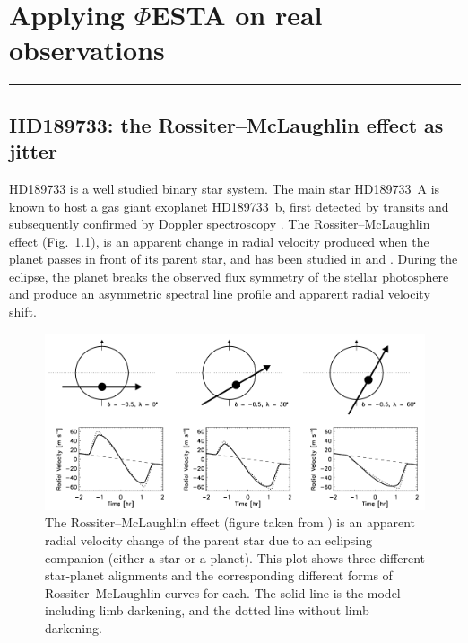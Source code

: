 \chapter{Applying $\mathit{\Phi}$ESTA on real observations}
\label{\thechapter}
\label{ch:Methods}


\rule{\textwidth}{1.6pt}
\minitoc
\clearpage



\section{HD189733: the Rossiter–McLaughlin effect as jitter}
\label{\thesection}
\label{sec:HD189733}

HD189733 is a well studied binary star system. The main star HD189733~A is known to host a gas giant exoplanet HD189733~b, first detected by transits and subsequently confirmed by Doppler spectroscopy \cite{Bouchy2005ELODIE}. The Rossiter–McLaughlin effect (Fig.~\ref{fig:rm-effect}), is an apparent change in radial velocity produced when the planet passes in front of its parent star, and has been studied in \cite{Cochran2006} and \cite{Triaud2009}. During the eclipse, the planet breaks the observed flux symmetry of the stellar photosphere and produce an asymmetric spectral line profile and apparent radial velocity shift.

\begin{figure}[htbp]
\centering
\includegraphics[width = 0.80 \linewidth]
{./Figures/Methods/rmeffect.png}
\caption[The Rossiter–McLaughlin effect]
{The Rossiter–McLaughlin effect (figure taken from \cite{Gaudi2007}) is an apparent radial velocity change of the parent star due to an eclipsing companion (either a star or a planet). This plot shows three different star-planet alignments and the corresponding different forms of Rossiter–McLaughlin curves for each. The solid line is the model including limb darkening, and the dotted line without limb darkening.}
\label{fig:rm-effect}
\end{figure} 

